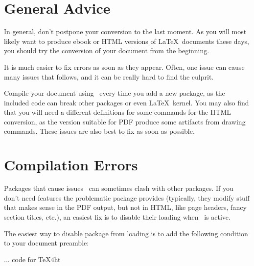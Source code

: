 
\section{General Advice}

In general, don't postpone your conversion to the last moment. As you will 
most likely want to produce ebook or HTML versions of \LaTeX\ documents these days, 
you should try the conversion of your document from the beginning. 

It is much easier to fix errors as soon as they appear. Often, one issue can
cause many issues that follows, and it can be really hard to find the culprit. 

Compile your document using \texfourht\ every time you add
a new package, as the included code can break other packages or even \LaTeX\ kernel. 
You may also find that you will need a different definitions for some commands for the HTML conversion, as the 
version suitable for PDF produce some artifacts from drawing commands. These issues are 
also best to fix as soon as possible.

\section{Compilation Errors}
\label{faq:compilation_errors}


\begin{issue}{Packages that cause issues}
\texfourht\ can sometimes clash with other packages. If you don't need features
the problematic package provides (typically, they modify stuff that makes sense in 
the PDF output, but not in HTML, like page headers, fancy section titles, etc.),
an easiest fix is to disable their loading when \texfourht\ is active. 

The easiest way to disable package from loading is to add the following
condition to your document preamble:

\begin{texsource}
\ifdefined\HCode
... code for TeX4ht
\else
\usepackage{foo}
\fi
\end{texsource}
\end{issue}

